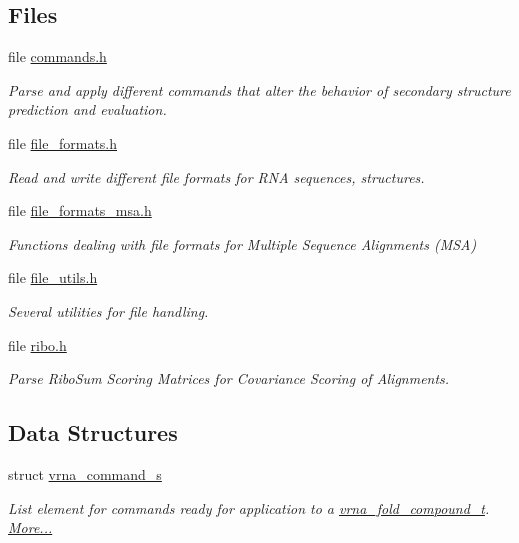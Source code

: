 \subsection*{Files}
\begin{DoxyCompactItemize}
\item 
file \mbox{\hyperlink{commands_8h}{commands.\+h}}
\begin{DoxyCompactList}\small\item\em Parse and apply different commands that alter the behavior of secondary structure prediction and evaluation. \end{DoxyCompactList}\item 
file \mbox{\hyperlink{file__formats_8h}{file\+\_\+formats.\+h}}
\begin{DoxyCompactList}\small\item\em Read and write different file formats for R\+NA sequences, structures. \end{DoxyCompactList}\item 
file \mbox{\hyperlink{file__formats__msa_8h}{file\+\_\+formats\+\_\+msa.\+h}}
\begin{DoxyCompactList}\small\item\em Functions dealing with file formats for Multiple Sequence Alignments (M\+SA) \end{DoxyCompactList}\item 
file \mbox{\hyperlink{file__utils_8h}{file\+\_\+utils.\+h}}
\begin{DoxyCompactList}\small\item\em Several utilities for file handling. \end{DoxyCompactList}\item 
file \mbox{\hyperlink{ribo_8h}{ribo.\+h}}
\begin{DoxyCompactList}\small\item\em Parse Ribo\+Sum Scoring Matrices for Covariance Scoring of Alignments. \end{DoxyCompactList}\end{DoxyCompactItemize}
\subsection*{Data Structures}
\begin{DoxyCompactItemize}
\item 
struct \mbox{\hyperlink{group__file__utils_structvrna__command__s}{vrna\+\_\+command\+\_\+s}}
\begin{DoxyCompactList}\small\item\em List element for commands ready for application to a \mbox{\hyperlink{group__fold__compound_ga1b0cef17fd40466cef5968eaeeff6166}{vrna\+\_\+fold\+\_\+compound\+\_\+t}}.  \mbox{\hyperlink{group__file__utils_structvrna__command__s}{More...}}\end{DoxyCompactList}\end{DoxyCompactItemize}
